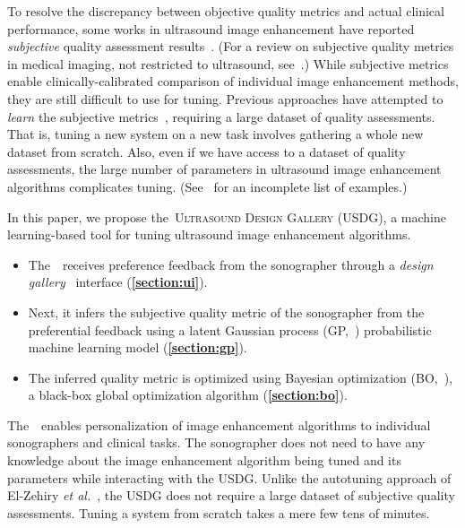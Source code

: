 To resolve the discrepancy between objective quality metrics and actual clinical performance, some works in ultrasound image enhancement have reported \textit{subjective} quality assessment results~\cite{loizou_quality_2006, hemmsen_ultrasound_2010, wong_monte_2012, kang_new_2016, mishra_edge_2018}.
(For a review on subjective quality metrics in medical imaging, not restricted to ultrasound, see~\cite{chow_review_2016}.)
While subjective metrics enable clinically-calibrated comparison of individual image enhancement methods, they are still difficult to use for tuning.
Previous approaches have attempted to \textit{learn} the subjective metrics~\cite{el-zehiry_learning_2013, abdi_automatic_2017, annangi_ai_2020}, requiring a large dataset of quality assessments.
That is, tuning a new system on a new task involves gathering a whole new dataset from scratch.
Also, even if we have access to a dataset of quality assessments, the large number of parameters in ultrasound image enhancement algorithms complicates tuning.
(See~\cite[Table 5]{finn_echocardiographic_2011} for an incomplete list of examples.)

In this paper, we propose the~\textsc{Ultrasound Design Gallery} (USDG), a machine learning-based tool for tuning ultrasound image enhancement algorithms.
\begin{itemize}
    \item[\ding{228}] The~\usdg~receives preference feedback from the sonographer through a \textit{design gallery}~\cite{brochu_bayesian_2010, 10.1145/3072959.3073598, koyama_sequential_2020, phan_color_2018, pmlr-v119-mikkola20a} interface (\textbf{\cref{section:ui}}).
    \vspace{0.02in}
  \item[\ding{228}] Next, it infers the subjective quality metric of the sonographer from the preferential feedback using a latent Gaussian process (GP,~\cite{rasmussen_gaussian_2006, pmlr-v119-mikkola20a}) probabilistic machine learning model (\textbf{\cref{section:gp}}).
    \vspace{0.02in}
  \item[\ding{228}] The inferred quality metric is optimized using Bayesian optimization (BO,~\cite{shahriari_taking_2016}), a black-box global optimization algorithm (\textbf{\cref{section:bo}}).
\end{itemize}
The~\usdg~enables personalization of image enhancement algorithms to individual sonographers and clinical tasks.
The sonographer does not need to have any knowledge about the image enhancement algorithm being tuned and its parameters while interacting with the USDG.
Unlike the autotuning approach of El-Zehiry \textit{et al.}~\cite{el-zehiry_learning_2013}, the USDG does not require a large dataset of subjective quality assessments.
Tuning a system from scratch takes a mere few tens of minutes.

